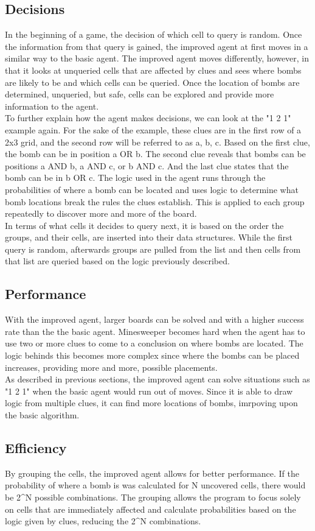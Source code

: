 \documentclass[13pt]{report}
\begin{document}
\subsection*{Decisions}
In the beginning of a game, the decision of which cell to query is random. Once the information from that query is gained, the improved agent at first moves in a similar way to the basic agent. The improved agent moves differently, however, in that it looks at unqueried cells that are affected by clues and sees where bombs are likely to be and which cells can be queried. Once the location of bombs are determined, unqueried, but safe, cells can be explored and provide more information to the agent.\\
To further explain how the agent makes decisions, we can look at the "1 2 1" example again. For the sake of the example, these clues are in the first row of a 2x3 grid, and the second row will be referred to as a, b, c. Based on the first clue, the bomb can be in position a OR b. The second clue reveals that bombs can be positions a AND b, a AND c, or b AND c. And the last clue states that the bomb can be in b OR c. The logic used in the agent runs through the probabilities of where a bomb can be located and uses logic to determine what bomb locations break the rules the clues establish. This is applied to each group repeatedly to discover more and more of the board.\\
In terms of what cells it decides to query next, it is based on the order the groups, and their cells, are inserted into their data structures. While the first query is random, afterwards groups are pulled from the list and then cells from that list are queried based on the logic previously described.

\subsection*{Performance}
With the improved agent, larger boards can be solved and with a higher success rate than the the basic agent. Minesweeper becomes hard when the agent has to use two or more clues to come to a conclusion on where bombs are located. The logic behinds this becomes more complex since where the bombs can be placed increases, providing more and more, possible placements.\\
As described in previous sections, the improved agent can solve situations such as "1 2 1" when the basic agent would run out of moves. Since it is able to draw logic from multiple clues, it can find more locations of bombs, imrpoving upon the basic algorithm.

\subsection*{Efficiency}
By grouping the cells, the improved agent allows for better performance. If the probability of where a bomb is was calculated for N uncovered cells, there would be 2^N possible combinations. The grouping allows the program to focus solely on cells that are immediately affected and calculate probabilities based on the logic given by clues, reducing the 2^N combinations.
\end{document}
